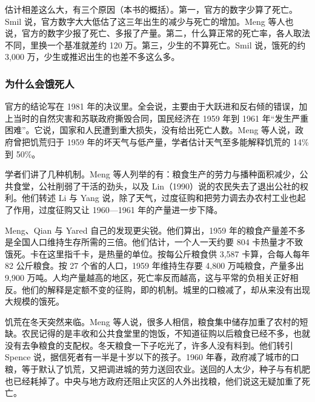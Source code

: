 估计相差这么大，有三个原因（本书的概括）。第一，官方的数字少算了死亡。Smil 说，官方数字大大低估了这三年出生的减少与死亡的增加\cite{smil1999}。Meng 等人也说，官方的数字少报了死亡、多报了产量\cite{mqy2010}。第二，什么算正常的死亡率，各人取法不同，里换一个基准就差约 120 万。第三，少生的不算死亡。Smil 说，饿死的约 3,000 万，少生或推迟出生的也差不多这么多\cite{smil1999}。

\subsubsection{为什么会饿死人}

官方的结论写在 1981 年的决议里。全会说，主要由于大跃进和反右倾的错误，加上当时的自然灾害和苏联政府撕毁合同，国民经济在 1959 年到 1961 年“发生严重困难”\cite{res1981}。它说，国家和人民遭到重大损失，没有给出死亡人数\cite{res1981}。Meng 等人说，政府曾把饥荒归于 1959 年的坏天气与低产量，学者估计天气至多能解释饥荒的 14\% 到 50\%\cite{mqy2010}。

学者们讲了几种机制。Meng 等人列举的有：粮食生产的劳力与播种面积减少，公共食堂，公社削弱了干活的劲头，以及 Lin（1990）说的农民失去了退出公社的权利\cite{mqy2010}。他们转述 Li 与 Yang 说，除了天气，过度征购和把劳力调去办农村工业也起了作用，过度征购又让 1960—1961 年的产量进一步下降\cite{mqy2010}。

Meng、Qian 与 Yared 自己的发现更尖锐。他们算出，1959 年的粮食产量差不多是全国人口维持生存所需的三倍\cite{mqy2010}。他们估计，一个人一天约要 804 卡热量才不致饿死\cite{mqy2010}。卡在这里指千卡，是热量的单位。按每公斤粮食供 3,587 卡算，合每人每年 82 公斤粮食\cite{mqy2010}。按 27 个省的人口，1959 年维持生存要 4,800 万吨粮食，产量多出 9,900 万吨\cite{mqy2010}。人均产量越高的地区，死亡率反而越高，这与平常的负相关正好相反\cite{mqy2010}。他们的解释是定额不变的征购，即的机制\cite{mqy2010}。城里的口粮减了，却从来没有出现大规模的饿死\cite{mqy2010}。

饥荒在冬天突然来临。Meng 等人说，很多人相信，粮食集中储存加重了农村的短缺\cite{mqy2010}。农民记得的是丰收和公共食堂里的饱饭，不知道征购以后粮食已经不多，也就没有去争粮食的支配权\cite{mqy2010}。冬天粮食一下子吃光了，许多人没有料到\cite{mqy2010}。他们转引 Spence 说，据信死者有一半是十岁以下的孩子\cite{mqy2010}。1960 年春，政府减了城市的口粮，等于默认了饥荒，又把调进城的劳力送回农业\cite{mqy2010}。送回的人太少，种子与有机肥也已经耗掉了\cite{mqy2010}。中央与地方政府还阻止灾区的人外出找粮，他们说这无疑加重了死亡\cite{mqy2010}。


